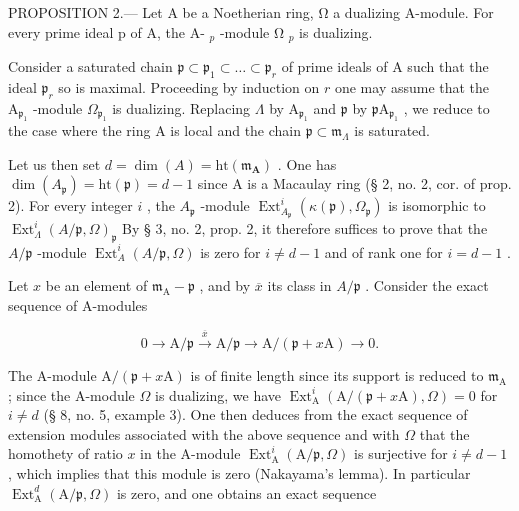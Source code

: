 PROPOSITION 2.--- Let A be a Noetherian ring, Ω a dualizing A-module. For every prime ideal p of A, the A- \(_{p}\) -module Ω \(_{p}\) is dualizing.

Consider a saturated chain \(\mathfrak{p} \subset \mathfrak{p}_1 \subset \ldots \subset \mathfrak{p}_r\) of prime ideals of A such that the ideal \(\mathfrak{p}_r\) so is maximal. Proceeding by induction on \(r\) one may assume that the \(\mathrm{A}_{\mathfrak{p}_1}\) -module \(\Omega_{\mathfrak{p}_1}\) is dualizing. Replacing \(\Lambda\) by \(\mathrm{A}_{\mathfrak{p}_1}\) and \(\mathfrak{p}\) by \(\mathfrak{p}\mathrm{A}_{\mathfrak{p}_1}\) , we reduce to the case where the ring A is local and the chain \(\mathfrak{p} \subset \mathfrak{m}_{\Lambda}\) is saturated.

Let us then set \(d = \dim(A) = \mathrm{ht}(\mathfrak{m}_{\mathbf{A}})\) . One has \(\dim(A_{\mathfrak{p}}) = \mathrm{ht}(\mathfrak{p}) = d - 1\) since A is a Macaulay ring (§ 2, no. 2, cor. of prop. 2). For every integer \(i\) , the \(A_{\mathfrak{p}}\) -module \(\operatorname{Ext}_{A_{\mathfrak{p}}}^{i}(\kappa(\mathfrak{p}), \Omega_{\mathfrak{p}})\) is isomorphic to \(\operatorname{Ext}_{\Lambda}^{i}(A/\mathfrak{p}, \Omega)_{\mathfrak{p}}\) By § 3, no. 2, prop. 2, it therefore suffices to prove that the \(A/\mathfrak{p}\) -module \(\operatorname{Ext}_{A}^{i}(A/\mathfrak{p}, \Omega)\) is zero for \(i \neq d - 1\) and of rank one for \(i = d - 1\) .

Let \(x\) be an element of \(\mathfrak{m}_{\mathrm{A}} - \mathfrak{p}\) , and by \(\overline{x}\) its class in \(A / \mathfrak{p}\) . Consider the exact sequence of A-modules

\[
0 \rightarrow \mathrm{A} / \mathfrak {p} \xrightarrow {\overline {{{x}}}} \mathrm{A} / \mathfrak {p} \longrightarrow \mathrm{A} / (\mathfrak {p} + x \mathrm{A}) \rightarrow 0.
\]

The A-module \(\mathrm{A} / (\mathfrak{p} + x\mathrm{A})\) is of finite length since its support is reduced to \(\mathfrak{m}_{\mathrm{A}}\) ; since the A-module \(\Omega\) is dualizing, we have \(\operatorname{Ext}_{\mathrm{A}}^{i}(\mathrm{A} / (\mathfrak{p} + x\mathrm{A}), \Omega) = 0\) for \(i \neq d\) (§ 8, no. 5, example 3). One then deduces from the exact sequence of extension modules associated with the above sequence and with \(\Omega\) that the homothety of ratio \(x\) in the A-module \(\operatorname{Ext}_{\mathrm{A}}^{i}(\mathrm{A} / \mathfrak{p}, \Omega)\) is surjective for \(i \neq d - 1\) , which implies that this module is zero (Nakayama's lemma). In particular \(\operatorname{Ext}_{\mathrm{A}}^{d}(\mathrm{A} / \mathfrak{p}, \Omega)\) is zero, and one obtains an exact sequence

